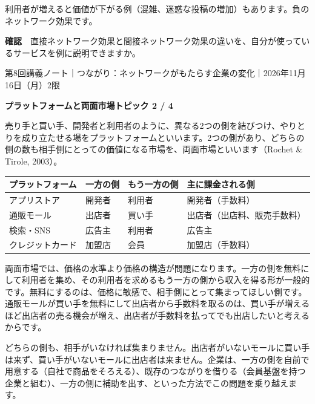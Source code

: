 \documentclass[paper=a4paper,fontsize=10pt,line_length=170mm,number_of_lines=46,baselineskip=1.6zw]{jlreq}
\newcommand\topichead[4]{%
  {\sffamily\footnotesize\color{grayt}#1\par}\vspace{1.5mm}
  {\sffamily\bfseries\LARGE #4}\hfill\colorbox{accent}{\sffamily\footnotesize\bfseries トピック #2 / #3}\par
  \vspace{1.2mm}{\color{ink}\hrule height 0.6pt}\vspace{3mm}}
\newcommand\subhead[1]{\par\vspace{2.6mm}{\sffamily\bfseries\large #1}\par\vspace{1.3mm}}
\begin{document}
利用者が増えると価値が下がる例（混雑、迷惑な投稿の増加）もあります。負のネットワーク効果です。\par\vspace{1.2mm}
\begin{checkbox}
{\sffamily\bfseries 確認}　直接ネットワーク効果と間接ネットワーク効果の違いを、自分が使っているサービスを例に説明できますか。\par
\end{checkbox}
\clearpage
\topichead{第8回講義ノート｜つながり：ネットワークがもたらす企業の変化｜2026年11月16日（月）2限}{2}{4}{プラットフォームと両面市場}
売り手と買い手、開発者と利用者のように、異なる2つの側を結びつけ、やりとりを成り立たせる場をプラットフォームといいます。2つの側があり、どちらの側の数も相手側にとっての価値になる市場を、両面市場といいます（Rochet \& Tirole, 2003）。\par\vspace{1.2mm}
\subhead{身近な両面市場}
\begin{center}\small\renewcommand{\arraystretch}{1.15}\setlength{\tabcolsep}{1.5mm}
\begin{tabular}{|p{24.0mm}|p{44.3mm}|p{44.3mm}|p{44.3mm}|}\arrayrulecolor{rulec}\hline
\rowcolor{papertwo}\sffamily\bfseries プラットフォーム & \sffamily\bfseries 一方の側 & \sffamily\bfseries もう一方の側 & \sffamily\bfseries 主に課金される側\\\hline
アプリストア & 開発者 & 利用者 & 開発者（手数料）\\\hline
通販モール & 出店者 & 買い手 & 出店者（出店料、販売手数料）\\\hline
検索・SNS & 広告主 & 利用者 & 広告主\\\hline
クレジットカード & 加盟店 & 会員 & 加盟店（手数料）\\\hline
\end{tabular}\end{center}\vspace{0.5mm}
\subhead{どちら側に課金するか}
両面市場では、価格の水準より価格の構造が問題になります。一方の側を無料にして利用者を集め、その利用者を求めるもう一方の側から収入を得る形が一般的です。無料にするのは、価格に敏感で、相手側にとって集まってほしい側です。通販モールが買い手を無料にして出店者から手数料を取るのは、買い手が増えるほど出店者の売る機会が増え、出店者が手数料を払ってでも出店したいと考えるからです。\par\vspace{1.2mm}
\subhead{「鶏と卵」の問題}
どちらの側も、相手がいなければ集まりません。出店者がいないモールに買い手は来ず、買い手がいないモールに出店者は来ません。企業は、一方の側を自前で用意する（自社で商品をそろえる）、既存のつながりを借りる（会員基盤を持つ企業と組む）、一方の側に補助を出す、といった方法でこの問題を乗り越えます。\par\vspace{1.2mm}
\end{document}
